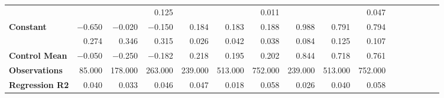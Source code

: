 \begin{tabular}{@{\extracolsep{5pt}}lrrrrrrrrrrrrrrr}
{\bf } & \phantom{***} & \phantom{***} & 0.125\phantom{\phantom{)}***} & \phantom{***} & \phantom{***} & 0.011\phantom{\phantom{)}***} & \phantom{***} & \phantom{***} & 0.047\phantom{\phantom{)}***} \\
{\bf Constant} & $-$0.650\phantom{\phantom{)}***} & $-$0.020\phantom{\phantom{)}***} & $-$0.150\phantom{\phantom{)}***} & 0.184\phantom{\phantom{)}***} & 0.183\phantom{\phantom{)}***} & 0.188\phantom{\phantom{)}***} & 0.988\phantom{\phantom{)}***} & 0.791\phantom{\phantom{)}***} & 0.794\phantom{\phantom{)}***} \\
{\bf } & 0.274\phantom{\phantom{)}***} & 0.346\phantom{\phantom{)}***} & 0.315\phantom{\phantom{)}***} & 0.026\phantom{\phantom{)}***} & 0.042\phantom{\phantom{)}***} & 0.038\phantom{\phantom{)}***} & 0.084\phantom{\phantom{)}***} & 0.125\phantom{\phantom{)}***} & 0.107\phantom{\phantom{)}***} \\
{\bf Control Mean} & $-$0.050\phantom{\phantom{)}***} & $-$0.250\phantom{\phantom{)}***} & $-$0.182\phantom{\phantom{)}***} & 0.218\phantom{\phantom{)}***} & 0.195\phantom{\phantom{)}***} & 0.202\phantom{\phantom{)}***} & 0.844\phantom{\phantom{)}***} & 0.718\phantom{\phantom{)}***} & 0.761\phantom{\phantom{)}***} \\
{\bf Observations} & 85.000\phantom{***} & 178.000\phantom{***} & 263.000\phantom{***} & 239.000\phantom{***} & 513.000\phantom{***} & 752.000\phantom{***} & 239.000\phantom{***} & 513.000\phantom{***} & 752.000\phantom{***} \\
{\bf Regression R2} & 0.040\phantom{***} & 0.033\phantom{***} & 0.046\phantom{***} & 0.047\phantom{***} & 0.018\phantom{***} & 0.058\phantom{***} & 0.026\phantom{***} & 0.040\phantom{***} & 0.058\phantom{***} \\
\hline
\end{tabular}
